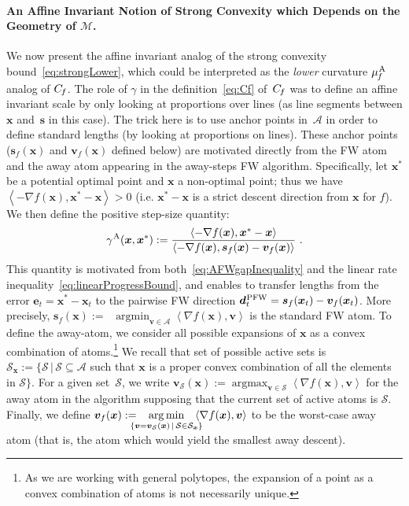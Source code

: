 \documentclass{article} %
\DeclareMathOperator*{\argmin}{\arg\min}
\DeclareMathOperator*{\argmax}{\arg\max}
\newcommand{\domain}{\mathcal{M}} %
\newcommand{\stepsize}{\gamma}
\newcommand{\PFW}{{\hspace{0.05em}\textnormal{PFW}}}
\newcommand{\away}{{\hspace{0.06em}\textnormal{\scriptsize A}}}
\newcommand{\Cf}{C_{\hspace{-0.08em}f}}
\newcommand{\strongConvAFW}{\mu_{\hspace{-0.08em}f}^\away}
\newcommand{\x}{\bm{x}}
\newcommand{\s}{\bm{s}}
\newcommand{\dd}{\bm{d}}
\newcommand{\vv}{\bm{v}} %
\newcommand{\Vertices}{\mathcal{A}} %
\renewcommand{\S}{\mathcal{S}}
\newcommand{\innerProd}[2]{\left\langle #1 , #2 \right\rangle}
\newcommand{\err}{\bm{e}} %
\newcommand{\0}{\mathbf{0}} %
\begin{document}
\paragraph{An Affine Invariant Notion of Strong Convexity which Depends on the
Geometry of $\domain$.} We now present the affine invariant analog of the
strong convexity bound~\eqref{eq:strongLower}, which could be interpreted as
the \emph{lower} curvature $\strongConvAFW$ analog of $\Cf$. The role of
$\stepsize$ in the definition~\eqref{eq:Cf} of~$\Cf$ was to define an affine
invariant scale by only looking at proportions over lines (as line segments
between $\x$ and~$\s$ in this case). The trick here is to use anchor points
in~$\Vertices$ in order to define standard lengths (by looking at proportions
on lines). These anchor points ($\s_f(\x)$ and $\vv_f(\x)$ defined below) are
motivated directly from the FW atom and the away atom appearing in the away-steps FW 
algorithm. Specifically, let $\x^*$ be a potential optimal point
and $\x$ a non-optimal point; thus we have $\innerProd{-\nabla f(\x)}{\x^*-\x} > 0$ 
(i.e. $\x^*\!-\!\x$ is a strict descent direction from $\x$ for $f$). 
We then define the positive step-size quantity:
\begin{equation}\label{eq:gammaAway}
\stepsize^\away(\x,\x^*) := \frac{\innerProd{-\nabla f(\x)}{\x^*-\x}
}{\innerProd{-\nabla f(\x)}{\s_f(\x) - \vv_f(\x)} } \ . 
\end{equation}
This quantity is
motivated from both~\eqref{eq:AFWgapInequality} and the linear rate
inequality~\eqref{eq:linearProgressBound}, and enables to transfer lengths
from the error $\err_t = \x^* - \x_t$ to the pairwise FW direction $\dd_t^\PFW = \s_f(\x_t) - \vv_f(\x_t)$.
More precisely, $\s_f(\x) :=$%
$~\argmin_{\vv \in \Vertices} \left\langle \nabla f(\x), \vv \right\rangle$ is the
standard FW atom. To define the away-atom, we consider all possible expansions of 
$\x$ as a convex combination of atoms.\footnote{As we are working with general polytopes,
the expansion of a point as a convex combination of atoms is not 
necessarily unique.}
%
We recall that set of possible active sets is $\S_{\x} := \{ \S \, | \, \S \subseteq \Vertices$ such that $\x$ is a
proper convex combination of
all the elements in $\S\}$.
For a given set~$\S$, we write $\vv_{\S}(\x) := \argmax_{\vv \in \S }
\left\langle \nabla f(\x), \vv \right\rangle$ for the away atom in the
algorithm supposing that the current set of active atoms is $\S$.
Finally, we define $\vv_f(\x) := \hspace{-3mm}\displaystyle\argmin_{\{\vv = \vv_{\S}(\x)
\,|\, \S \in \S_{\x} \}} \textstyle \hspace{-3mm}\left\langle \nabla f(\x), \vv
\right\rangle$ to be the worst-case away atom (that is, the atom which would
yield the smallest away descent).
\end{document}
